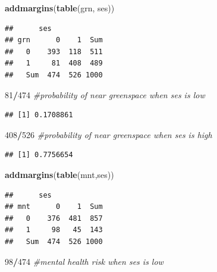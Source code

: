 \documentclass[
]{book}
\newenvironment{Shaded}{\begin{snugshade}}{\end{snugshade}}
\newcommand{\CommentTok}[1]{\textcolor[rgb]{0.56,0.35,0.01}{\textit{#1}}}
\newcommand{\DecValTok}[1]{\textcolor[rgb]{0.00,0.00,0.81}{#1}}
\newcommand{\FunctionTok}[1]{\textcolor[rgb]{0.13,0.29,0.53}{\textbf{#1}}}
\newcommand{\NormalTok}[1]{#1}
\newcommand{\SpecialCharTok}[1]{\textcolor[rgb]{0.81,0.36,0.00}{\textbf{#1}}}
\begin{document}
\begin{Shaded}
\begin{Highlighting}[]
\FunctionTok{addmargins}\NormalTok{(}\FunctionTok{table}\NormalTok{(grn, ses))}
\end{Highlighting}
\end{Shaded}

\begin{verbatim}
##      ses
## grn      0    1  Sum
##   0    393  118  511
##   1     81  408  489
##   Sum  474  526 1000
\end{verbatim}

\begin{Shaded}
\begin{Highlighting}[]
\DecValTok{81}\SpecialCharTok{/}\DecValTok{474} \CommentTok{\#probability of near greenspace when ses is low}
\end{Highlighting}
\end{Shaded}

\begin{verbatim}
## [1] 0.1708861
\end{verbatim}

\begin{Shaded}
\begin{Highlighting}[]
\DecValTok{408}\SpecialCharTok{/}\DecValTok{526} \CommentTok{\#probability of near greenspace when ses is high}
\end{Highlighting}
\end{Shaded}

\begin{verbatim}
## [1] 0.7756654
\end{verbatim}

\begin{Shaded}
\begin{Highlighting}[]
\FunctionTok{addmargins}\NormalTok{(}\FunctionTok{table}\NormalTok{(mnt,ses))}
\end{Highlighting}
\end{Shaded}

\begin{verbatim}
##      ses
## mnt      0    1  Sum
##   0    376  481  857
##   1     98   45  143
##   Sum  474  526 1000
\end{verbatim}

\begin{Shaded}
\begin{Highlighting}[]
\DecValTok{98}\SpecialCharTok{/}\DecValTok{474} \CommentTok{\#mental health risk when ses is low}
\end{Highlighting}
\end{Shaded}
\end{document}
